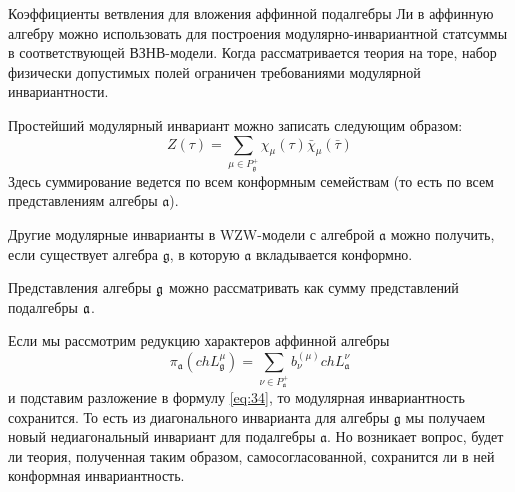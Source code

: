 Коэффициенты ветвления для вложения аффинной подалгебры Ли в аффинную алгебру можно использовать для
построения модулярно-инвариантной статсуммы в соответствующей ВЗНВ-модели. Когда рассматривается
теория на торе,  набор физически допустимых полей ограничен требованиями модулярной инвариантности.

Простейший модулярный инвариант можно записать следующим образом:
\begin{equation}
  \label{eq:34}
   Z(\tau)=\sum_{ \mu\in P^{+}_{\mathfrak{g}}} \chi_{\mu}(\tau)\bar \chi_{\mu}(\bar \tau)
\end{equation}
Здесь суммирование ведется по всем конформным семействам (то есть по всем представлениям алгебры
$\mathfrak{a}$).

Другие модулярные инварианты в WZW-модели с алгеброй $\mathfrak{a}$ можно получить, если существует
алгебра $\mathfrak{g}$, в которую $\mathfrak{a}$ вкладывается конформно.  

Представления алгебры $\mathfrak{g}$ можно рассматривать как сумму представлений подалгебры $\mathfrak{a}$. 

Если мы рассмотрим редукцию характеров аффинной алгебры
\begin{equation}
  \label{eq:8}
   \pi_{\mathfrak{a}}(ch L^{\mu}_{\mathfrak{g}})=
  \sum_{\nu\in P^{+}_{\mathfrak{a}}}b^{(\mu)}_{\nu} ch L^{\nu}_{\mathfrak{a}}
\end{equation}
и подставим разложение в формулу \eqref{eq:34}, то модулярная инвариантность сохранится. То есть из
диагонального инварианта для алгебры $\mathfrak{g}$ мы получаем новый недиагональный инвариант для
подалгебры $\mathfrak{a}$. Но возникает вопрос, будет ли теория, полученная таким образом, самосогласованной, сохранится ли в
ней конформная инвариантность.

